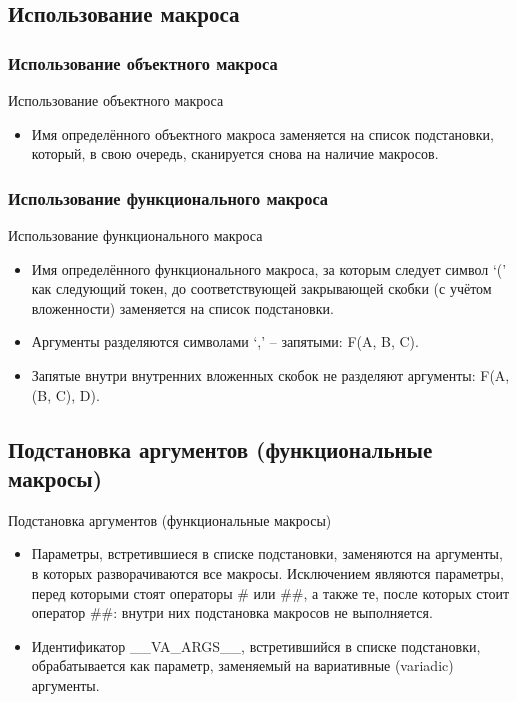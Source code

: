     \subsection{Использование макроса}
    \subsubsection{Использование объектного макроса}
    \begin{frame}{Использование объектного макроса}
        \begin{itemize}
            \item Имя определённого объектного макроса заменяется на список подстановки, который, в свою очередь,
                сканируется снова на наличие макросов.
        \end{itemize}
    \end{frame}
    \subsubsection{Использование функционального макроса}
    \begin{frame}{Использование функционального макроса}
        \begin{itemize}
            \item Имя определённого функционального макроса, за которым следует символ `(' как следующий токен,
                до соответствующей закрывающей скобки (с учётом вложенности) заменяется на список подстановки.
            \item Аргументы разделяются символами `,' -- запятыми: F(A, B, C).
            \item Запятые внутри внутренних вложенных скобок не разделяют аргументы: F(A, (B, C), D).
        \end{itemize}
    \end{frame}
    \subsection{Подстановка аргументов (функциональные макросы)}
    \begin{frame}{Подстановка аргументов (функциональные макросы)}
        \begin{itemize}
            \item Параметры, встретившиеся в списке подстановки, заменяются на аргументы,
                в которых разворачиваются все макросы. Исключением являются
                параметры, перед которыми стоят операторы \# или \#\#, а также те,
                после которых стоит оператор \#\#: внутри них подстановка макросов не выполняется.
            \item Идентификатор \_\_VA\_ARGS\_\_, встретившийся в списке подстановки,
                обрабатывается как параметр, заменяемый на вариативные (variadic) аргументы.
        \end{itemize}
    \end{frame}
